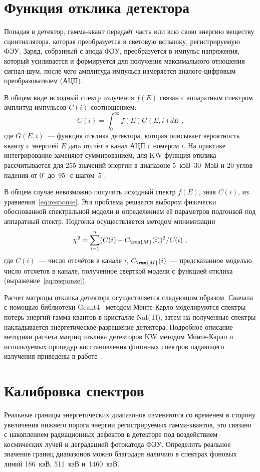 \section{Функция отклика детектора}
Попадая в детектор, гамма-квант передаёт часть или всю свою энергию веществу 
сцинтиллятора, которая преобразуется в световую вспышку, регистрируемую ФЭУ. 
Заряд, собранный с анода ФЭУ, преобразуется в импульс напряжения, который усиливается и формируется для получения 
максимального отношения сигнал-шум, после чего амплитуда импульса измеряется 
аналого-цифровым преобразователем (АЦП). 

В общем виде исходный спектр излучения $f(E)$ связан с аппаратным спектром амплитуд 
импульсов $C(i)$ соотношением:
\begin{equation}\label{eq:response}
    C(i)=\int_{0}^{\infty} f(E)G(E,i) dE \mbox{ ,}
\end{equation}
где $G(E,i)$~--- функция отклика детектора, которая описывает вероятность кванту 
с энергией $E$ дать отсчёт в канал АЦП с номером $i$. На практике интегрирование 
заменяют суммированием, для KW функция отклика рассчитывается для 255 
значений энергии в диапазоне 5~кэВ--30~МэВ и 20 углов падения 
от 0$^\circ$ до~95$^\circ$ с шагом~5$^\circ$.

В общем случае невозможно получить исходный спектр $f(E)$, зная $C(i)$, из 
уравнения~\ref{eq:response}.  Эта проблема решается выбором физически обоснованной 
спектральной модели и определением её параметров подгонкой под аппаратный спектр. 
Подгонка осуществляется методом минимизации
\begin{equation}\label{eq:chisq}
    \chi^2=\sum\limits_{i=1}^n(C(i)-C_\rmn{M}(i))^2/C(i) \mbox{ ,}
\end{equation}
где $C(i)$~--- число отсчётов в канале $i$, $C_\rmn{M}(i)$~--- предсказанное моделью число отсчетов в канале, 
полученное свёрткой модели с функцией отклика (выражение~\ref{eq:response}).

Расчет матрицы отклика детектора осуществляется следующим образом.
Сначала с помощью библиотеки Geant4~\citep{GEANT4_2003NIMPA} методом Монте-Карло 
моделируются спектры потерь энергий гамма-квантов в кристалле NaI(Tl), затем на 
полученные спектры накладывается энергетическое разрешение детектора.
Подробное описание методики расчета матриц отклика детекторов KW методом Монте-Карло 
и используемых процедур восстановления фотонных спектров падающего излучения 
приведены в работе~\citep{Terekhov_1998AIPC}.

\section{Калибровка спектров}
Реальные границы энергетических диапазонов изменяются со временем в сторону 
увеличения нижнего порога энергии регистрируемых гамма-квантов, это  
связано с накоплением радиационных дефектов в детекторе под воздействием 
космических лучей и деградацией фотокатода ФЭУ. Определить реальное значение 
границ диапазонов можно благодаря наличию в спектрах фоновых линий 186~кэВ, 511~кэВ и~1460~кэВ.

